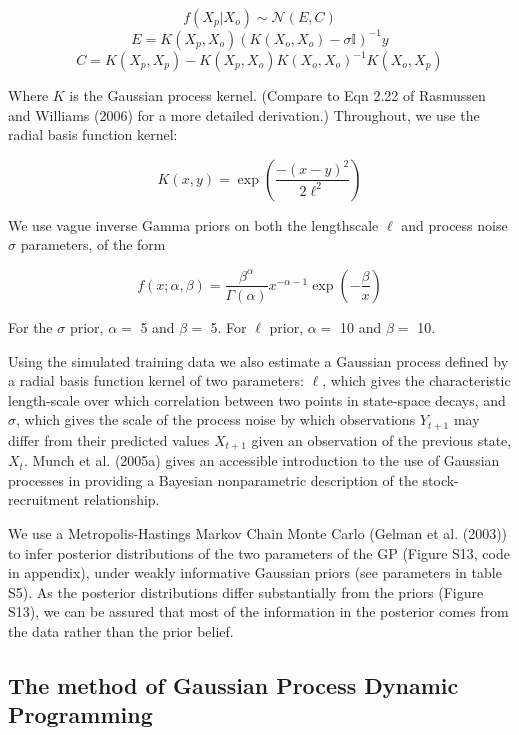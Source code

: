 \documentclass[]{components/elsarticle}
\begin{document}
\[f(X_p|X_o) \sim \mathcal{N}(E,C)\]
\[E = K(X_p, X_o) \left(K(X_o,X_o) - \sigma \mathbb{I} \right)  ^{-1} y\]
\[C = K(X_p, X_p) - K(X_p, X_o) K(X_o,X_o)^{-1} K(X_o, X_p)\]

Where $K$ is the Gaussian process kernel. (Compare to Eqn 2.22 of
Rasmussen and Williams (2006) for a more detailed derivation.)
Throughout, we use the radial basis function kernel:

\[ K(x,y) = \exp\left(\frac{-(x-y)^2}{2 \ell^2} \right)\]

We use vague inverse Gamma priors on both the lengthscale $\ell$ and
process noise $\sigma$ parameters, of the form

\[f(x; \alpha, \beta) = \frac{\beta^\alpha}{\Gamma(\alpha)} x^{-\alpha - 1}\exp\left(-\frac{\beta}{x}\right)\]

For the $\sigma$ prior, $\alpha = $ 5 and $\beta = $ 5. For $\ell$
prior, $\alpha = $ 10 and $\beta = $ 10.

Using the simulated training data we also estimate a Gaussian process
defined by a radial basis function kernel of two parameters: $\ell$,
which gives the characteristic length-scale over which correlation
between two points in state-space decays, and $\sigma$, which gives the
scale of the process noise by which observations $Y_{t+1}$ may differ
from their predicted values $X_{t+1}$ given an observation of the
previous state, $X_t$. Munch et al. (2005a) gives an accessible
introduction to the use of Gaussian processes in providing a Bayesian
nonparametric description of the stock-recruitment relationship.

We use a Metropolis-Hastings Markov Chain Monte Carlo (Gelman et al.
(2003)) to infer posterior distributions of the two parameters of the GP
(Figure S13, code in appendix), under weakly informative Gaussian priors
(see parameters in table S5). As the posterior distributions differ
substantially from the priors (Figure S13), we can be assured that most
of the information in the posterior comes from the data rather than the
prior belief.

\subsection{The method of Gaussian Process Dynamic
Programming}\label{the-method-of-gaussian-process-dynamic-programming}
\end{document}
